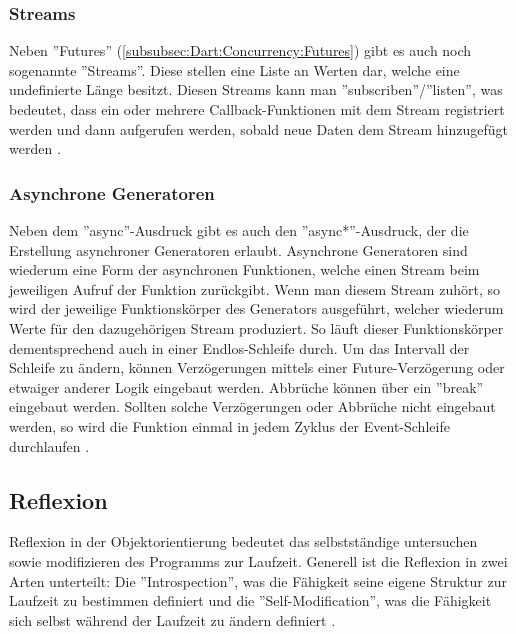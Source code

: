     \subsubsection{Streams}
    \label{subsubsec:Dart:Concurrency:Streams}
    Neben ''Futures'' (\ref{subsubsec:Dart:Concurrency:Futures}) gibt es auch noch sogenannte ''Streams''.
    Diese stellen eine Liste an Werten dar, welche eine undefinierte Länge besitzt.
    Diesen Streams kann man ''subscriben''/''listen'', was bedeutet, dass ein oder mehrere Callback-Funktionen mit dem Stream registriert werden und dann aufgerufen werden, sobald neue Daten dem Stream hinzugefügt werden \cite{book:Dart:DPL_GiladBracha}.
    
    \subsubsection{Asynchrone Generatoren}
    \label{subsubsec:Dart:Concurrency:AsyncGen}
    Neben dem ''async''-Ausdruck gibt es auch den ''async*''-Ausdruck, der die Erstellung asynchroner Generatoren erlaubt.
    Asynchrone Generatoren sind wiederum eine Form der asynchronen Funktionen, welche einen Stream beim jeweiligen Aufruf der Funktion zurückgibt.
    Wenn man diesem Stream zuhört, so wird der jeweilige Funktionskörper des Generators ausgeführt, welcher wiederum Werte für den dazugehörigen Stream produziert.
    So läuft dieser Funktionskörper dementsprechend auch in einer Endlos-Schleife durch.
    Um das Intervall der Schleife zu ändern, können Verzögerungen mittels einer Future-Verzögerung oder etwaiger anderer Logik eingebaut werden. Abbrüche können über ein ''break'' eingebaut werden.
    Sollten solche Verzögerungen oder Abbrüche nicht eingebaut werden, so wird die Funktion einmal in jedem Zyklus der Event-Schleife durchlaufen \cite{book:Dart:DPL_GiladBracha}.

\subsection{Reflexion}
\label{subsec:Dart:Reflexion}
Reflexion in der Objektorientierung bedeutet das selbstständige untersuchen sowie modifizieren des Programms zur Laufzeit.
Generell ist die Reflexion in zwei Arten unterteilt: Die ''Introspection'', was die Fähigkeit seine eigene Struktur zur Laufzeit zu bestimmen definiert und die ''Self-Modification'', was die Fähigkeit sich selbst während der Laufzeit zu ändern definiert \cite{book:Dart:DPL_GiladBracha}.

